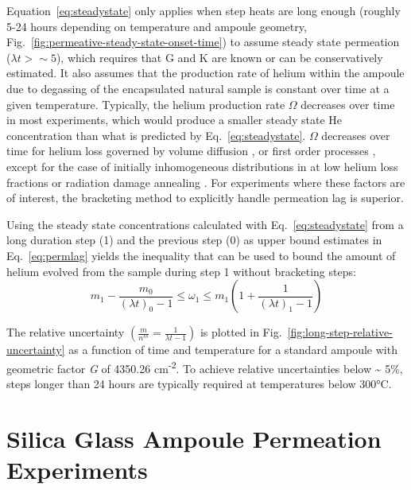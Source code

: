 Equation~\eqref{eq:steadystate} only applies when step heats are long enough (roughly 5-24 hours depending on temperature and ampoule geometry, Fig.~\ref{fig:permeative-steady-state-onset-time}) to assume steady state permeation (\(\lambda t > \sim 5\)), which requires that G and K are known or can be conservatively estimated. It also assumes that the production rate of helium within the ampoule due to degassing of the encapsulated natural sample is constant over time at a given temperature. Typically, the helium production rate \(\Omega\) decreases over time in most experiments, which would produce a smaller steady state He concentration than what is predicted by Eq.~\eqref{eq:steadystate}. \(\Omega\) decreases over time for helium loss governed by volume diffusion \citep{wolf1996,reinersfarley1999,farleymckeon2015,farley2018,farley2024}, or first order processes \citep{yakubovich2010,wilson1973}, except for the case of initially inhomogeneous distributions in at low helium loss fractions \citep{goldsmith2020,ketcham2011,shuster2004,farley1996} or radiation damage annealing \citep{cherniak2019,guenthner2013,flowers2007,flowers2009,shuster2006}. For experiments where these factors are of interest, the bracketing method to explicitly handle permeation lag is superior.

Using the steady state concentrations calculated with Eq.~\eqref{eq:steadystate} from a long duration step (1) and the previous step (0) as upper bound estimates in Eq.~\eqref{eq:permlag} yields the inequality that can be used to bound the amount of helium evolved from the sample during step 1 without bracketing steps:\emph{\hfill\break
}\begin{equation}
\label{eq:bound}
m_{1} - \frac{m_{0}}{(\lambda t)_{0} - 1} \leq \omega_{1} \leq m_{1}\left( 1 + \frac{1}{(\lambda t)_{1} - 1} \right)
\end{equation}

The relative uncertainty \(\left( \frac{m}{n^{ss}} = \frac{1}{\lambda t - 1} \right)\) is plotted in Fig.~\ref{fig:long-step-relative-uncertainty} as a function of time and temperature for a standard ampoule with geometric factor \emph{G} of 4350.26 cm\textsuperscript{-2}. To achieve relative uncertainties below \textasciitilde{} 5\%, steps longer than 24 hours are typically required at temperatures below 300°C.

\section{Silica Glass Ampoule Permeation Experiments}\label{silica-glass-ampoule-permeation-experiments}

